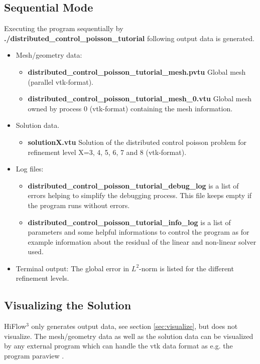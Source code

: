 \documentclass[a4paper, 11pt, twoside]{article}
\begin{document}
\subsection{Sequential Mode} 
Executing the program sequentially by \textbf{./distributed\_control\_poisson\_tutorial} following output data is generated. 
\begin{itemize}
\item Mesh/geometry data:
\begin{itemize}
\item \textbf{distributed\_control\_poisson\_tutorial\_mesh.pvtu} Global mesh (parallel vtk-format). 
\item \textbf{distributed\_control\_poisson\_tutorial\_mesh\_0.vtu} Global mesh owned by process 0 (vtk-format) containing the mesh information.
\end{itemize}
\item Solution data. 
\begin{itemize}
\item \textbf{solutionX.vtu} Solution of the distributed control poisson problem for refinement level X=3, 4, 5, 6, 7 and 8 (vtk-format). 
\end{itemize}
\item Log files:
\begin{itemize}
\item \textbf{distributed\_control\_poisson\_tutorial\_debug\_log} is a list of errors helping to simplify the debugging process. This file keeps empty if the program runs without errors.
\item \textbf{distributed\_control\_poisson\_tutorial\_info\_log} is a list of parameters and some helpful informations to control the program as for example information 
                                         about the residual of the linear and non-linear solver used.
\end{itemize}
\item Terminal output: The global error in $L^2$-norm is listed for the different refinement levels. 
\end{itemize}

\subsection{Visualizing the Solution}
HiFlow$^3$ only generates output data, see section \ref{sec:visualize}, but does not visualize. The mesh/geometry data as well as the solution data can be visualized 
by any external program which can handle the vtk data format as e.g. the program paraview \cite{Paraview}. 
\end{document}
